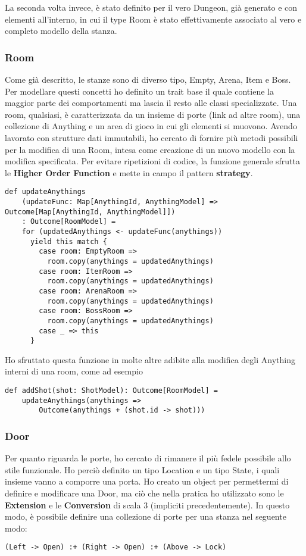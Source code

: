 La seconda volta invece, è stato definito per il vero Dungeon, già generato e con elementi all'interno, in cui il type Room è stato effettivamente associato al vero e completo modello della stanza.

\subsubsection{Room}
Come già descritto, le stanze sono di diverso tipo, Empty, Arena, Item e Boss. Per modellare questi concetti ho definito un trait base il quale contiene la maggior parte dei comportamenti ma lascia il resto alle classi specializzate. 
Una room, qualsiasi, è caratterizzata da un insieme di porte (link ad altre room), una collezione di Anything e un area di gioco in cui gli elementi si muovono. 
Avendo lavorato con strutture dati immutabili, ho cercato di fornire più metodi possibili per la modifica di una Room, intesa come creazione di un nuovo modello con la modifica specificata. Per evitare ripetizioni di codice, la funzione generale sfrutta le \textbf{Higher Order Function} e mette in campo il pattern \textbf{strategy}. 
\begin{lstlisting}[basicstyle=\tiny]
    def updateAnythings
    (updateFunc: Map[AnythingId, AnythingModel] => Outcome[Map[AnythingId, AnythingModel]])
    : Outcome[RoomModel] =
    for (updatedAnythings <- updateFunc(anythings))
      yield this match {
        case room: EmptyRoom =>
          room.copy(anythings = updatedAnythings)
        case room: ItemRoom =>
          room.copy(anythings = updatedAnythings)
        case room: ArenaRoom =>
          room.copy(anythings = updatedAnythings)
        case room: BossRoom =>
          room.copy(anythings = updatedAnythings)
        case _ => this
      }
\end{lstlisting}

Ho sfruttato questa funzione in molte altre adibite alla modifica degli Anything interni di una room, come ad esempio 
\begin{lstlisting}[basicstyle=\tiny]
  def addShot(shot: ShotModel): Outcome[RoomModel] =
    updateAnythings(anythings => 
        Outcome(anythings + (shot.id -> shot)))
\end{lstlisting}

\subsubsection{Door}
Per quanto riguarda le porte, ho cercato di rimanere il più fedele possibile allo stile funzionale. Ho perciò definito un tipo Location e un tipo State, i quali insieme vanno a comporre una porta.
Ho creato un object per permettermi di definire e modificare una Door, ma ciò che nella pratica ho utilizzato sono le \textbf{Extension} e le \textbf{Conversion} di scala 3 (impliciti precedentemente).
In questo modo, è possibile definire una collezione di porte per una stanza nel seguente modo: 
\begin{lstlisting}[basicstyle=\tiny]
    (Left -> Open) :+ (Right -> Open) :+ (Above -> Lock)
\end{lstlisting}

